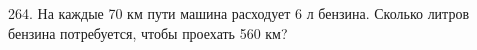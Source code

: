 264. На каждые 70 км пути машина расходует 6 л бензина. Сколько литров бензина потребуется, чтобы проехать 560 км?\\
